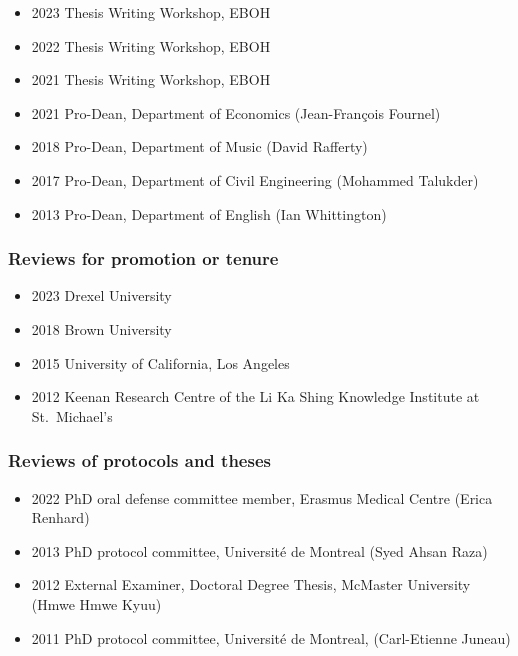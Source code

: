 \documentclass[
  letterpaper,
  DIV=11,
  numbers=noendperiod]{scrartcl}
\providecommand{\tightlist}{%
  \setlength{\itemsep}{0pt}\setlength{\parskip}{0pt}}\usepackage{longtable,booktabs,array}
\begin{document}
\begin{itemize}
\tightlist
\item
  2023 Thesis Writing Workshop, EBOH
\item
  2022 Thesis Writing Workshop, EBOH
\item
  2021 Thesis Writing Workshop, EBOH
\item
  2021 Pro-Dean, Department of Economics (Jean-François Fournel)
\item
  2018 Pro-Dean, Department of Music (David Rafferty)
\item
  2017 Pro-Dean, Department of Civil Engineering (Mohammed Talukder)
\item
  2013 Pro-Dean, Department of English (Ian Whittington)
\end{itemize}

\subsubsection{Reviews for promotion or
tenure}\label{reviews-for-promotion-or-tenure}

\begin{itemize}
\tightlist
\item
  2023 Drexel University
\item
  2018 Brown University
\item
  2015 University of California, Los Angeles
\item
  2012 Keenan Research Centre of the Li Ka Shing Knowledge Institute at
  St.~Michael's
\end{itemize}

\subsubsection{Reviews of protocols and
theses}\label{reviews-of-protocols-and-theses}

\begin{itemize}
\tightlist
\item
  2022 PhD oral defense committee member, Erasmus Medical Centre (Erica
  Renhard)
\item
  2013 PhD protocol committee, Université de Montreal (Syed Ahsan Raza)
\item
  2012 External Examiner, Doctoral Degree Thesis, McMaster University
  (Hmwe Hmwe Kyuu)
\item
  2011 PhD protocol committee, Université de Montreal, (Carl-Etienne
  Juneau)
\end{itemize}
\end{document}
